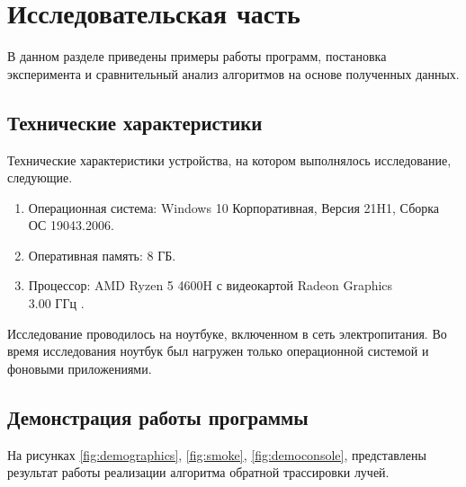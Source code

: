\chapter{Исследовательская часть}

В данном разделе приведены примеры работы программ, постановка эксперимента и сравнительный анализ алгоритмов на основе полученных данных.

\section{Технические характеристики}

Технические характеристики устройства, на котором выполнялось исследование, следующие.

\begin{enumerate}
	\item Операционная система: Windows 10 Корпоративная, Версия	21H1, Сборка ОС 19043.2006.
	\item Оперативная память: 8 ГБ.
	\item Процессор: AMD Ryzen 5 4600H с видеокартой Radeon Graphics \\3.00 ГГц \cite{processor}.
\end{enumerate}

Исследование проводилось на ноутбуке, включенном в сеть электропитания. 
Во время исследования ноутбук был нагружен только операционной системой и фоновыми приложениями.

\section{Демонстрация работы программы}

На рисунках \ref{fig:demographics}, \ref{fig:smoke}, \ref{fig:democonsole}, представлены результат работы реализации алгоритма обратной трассировки лучей.

